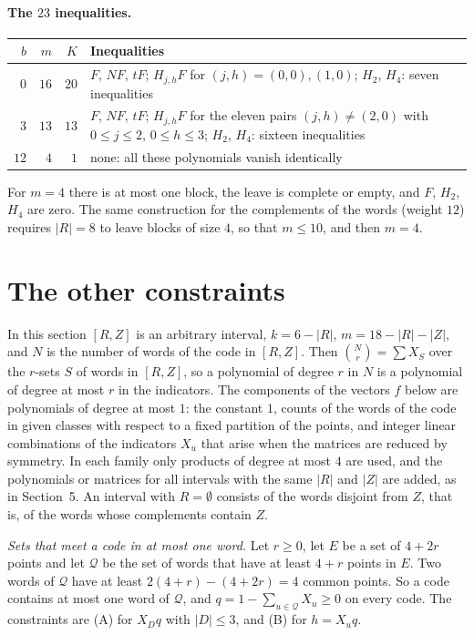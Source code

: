 \documentclass[11pt,a4paper]{article}
\newcommand{\abs}[1]{\lvert #1\rvert}
\begin{document}
\paragraph{The $23$ inequalities.}
\begin{center}
\begin{tabular}{rrrp{11.2cm}}
\hline
$b$ & $m$ & $K$ & Inequalities \\
\hline
$0$ & $16$ & $20$ & $F$, $N\!F$, $tF$; $H_{j,h}F$ for $(j,h)=(0,0),(1,0)$;
 $H_2$, $H_4$: seven inequalities\\
$3$ & $13$ & $13$ & $F$, $N\!F$, $tF$; $H_{j,h}F$ for the eleven pairs
 $(j,h)\ne(2,0)$ with $0\le j\le 2$, $0\le h\le 3$; $H_2$, $H_4$: sixteen
 inequalities\\
$12$ & $4$ & $1$ & none: all these polynomials vanish identically\\
\hline
\end{tabular}
\end{center}
For $m=4$ there is at most one block, the leave is complete or empty, and
$F$, $H_2$, $H_4$ are zero. The same construction for the complements of
the words (weight $12$) requires $\abs R=8$ to leave blocks of size $4$, so
that $m\le 10$, and then $m=4$.

\section{The other constraints}

In this section $[R,Z]$ is an arbitrary interval, $k=6-\abs R$,
$m=18-\abs R-\abs Z$, and $N$ is the number of words of the code in
$[R,Z]$. Then $\binom Nr=\sum X_S$ over the $r$-sets $S$ of words in
$[R,Z]$, so a polynomial of degree $r$ in $N$ is a polynomial of degree at most $r$
in the indicators. The components of the vectors $f$ below are polynomials of
degree at most $1$: the constant $1$, counts of the words of the code in
given classes with respect to a fixed partition of the points, and integer
linear combinations of the indicators $X_u$ that arise when the matrices
are reduced by symmetry. In each family only products of degree at most
$4$ are used, and the polynomials or matrices for all intervals with the
same $\abs R$ and $\abs Z$ are added, as in Section~5. An interval with
$R=\emptyset$ consists of the words disjoint from $Z$, that is, of the
words whose complements contain $Z$.

\emph{Sets that meet a code in at most one word.} Let $r\ge 0$, let $E$ be a set of
$4+2r$ points and let $\mathcal Q$ be the set of words that have at least
$4+r$ points in $E$. Two words of $\mathcal Q$ have at least
$2(4+r)-(4+2r)=4$ common points. So a code contains at most one word of
$\mathcal Q$, and $q=1-\sum_{u\in\mathcal Q}X_u\ge 0$ on every code. The
constraints are (A) for $X_Dq$ with $\abs D\le 3$, and (B) for $h=X_uq$.
\end{document}
